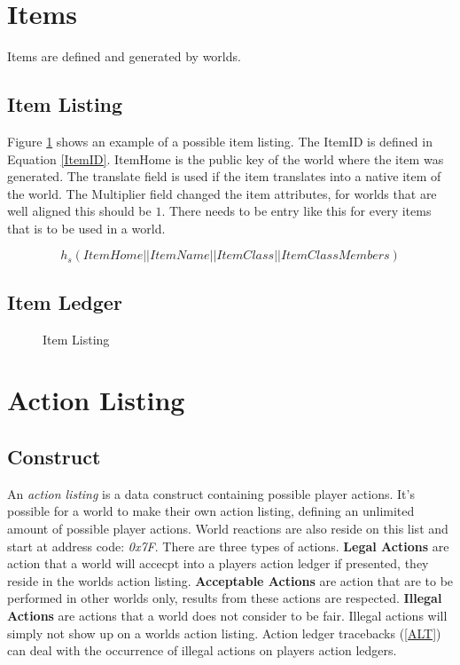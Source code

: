 \documentclass[runningheads,a4paper]{llncs}
\begin{document}
\section{Items} 
Items are defined and generated by worlds. 

\subsection{Item Listing}
Figure \ref{IList} shows an example of a possible item listing. The ItemID is defined in Equation \ref{ItemID}. ItemHome is the public key of the world where the item was generated. The translate field is used if the item translates into a native item of the world. The Multiplier field changed the item attributes, for worlds that are well aligned this should be $1$. There needs to be entry like this for every items that is to be used in a world.  

\begin{equation}
\label{ItemID}
h_s(ItemHome || ItemName || ItemClass || ItemClassMembers)
\end{equation}

\subsection{Item Ledger}

\begin{figure}
\caption{Item Listing}
\label{IList}

\end{figure}

\section{Action Listing} 
\subsection{Construct}
An \textit{action listing} is a data construct containing possible player actions. It's possible for a world to make their own action listing, defining an unlimited amount of possible player actions. World reactions are also reside on this list and start at address code: \textit{0x7F}. There are three types of actions. \textbf{Legal Actions} are action that a world will accecpt into a players action ledger if presented, they reside in the worlds action listing. \textbf{Acceptable Actions} are action that are to be performed in other worlds only, results from these actions are respected. \textbf{Illegal Actions} are actions that a world does not consider to be fair. Illegal actions will simply not show up on a worlds action listing. Action ledger tracebacks (\ref{ALT}) can deal with the occurrence of illegal actions on players action ledgers. 
\end{document}

